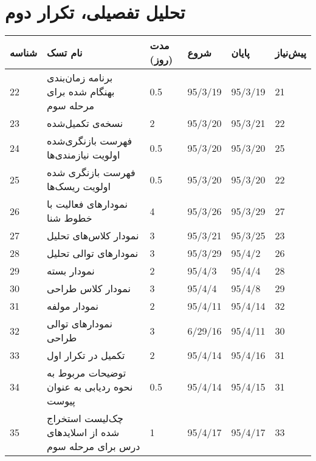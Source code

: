 \section{تحلیل تفصیلی، تکرار دوم}	
\begin{tabular}[H]{ | l | l | l | l | l | l | }
	\hline
	شناسه & نام تسک & مدت (روز) & شروع & پایان & پیش‌نیاز    \\ \hline
	22 & برنامه زمان‌بندی  بهنگام شده برای مرحله سوم & 0.5   &   95/3/19 &   95/3/19 & 21    \\ \hline
	23 & نسخه‌ی تکمیل‌شده \lr{Usecase Realizations} & 2   &   95/3/20 &   95/3/21 & 22    \\ \hline
	24 &  فهرست بازنگری‌شده اولویت نیازمندی‌ها & 0.5   &   95/3/20 &   95/3/20 & 25    \\ \hline
	25 &  فهرست بازنگری شده اولویت ریسک‌ها & 0.5   &   95/3/20 &   95/3/20 & 22    \\ \hline
	26 & نمودارهای فعالیت با خطوط شنا & 4   &   95/3/26 &   95/3/29 & 27    \\ \hline
	27 & نمودار کلاس‌های تحلیل & 3   &   95/3/21 &   95/3/25 & 23    \\ \hline
	28 & نمودارهای توالی تحلیل & 3   &   95/3/29 &   95/4/2 & 26    \\ \hline
	29 & نمودار بسته & 2   &   95/4/3 &   95/4/4 & 28    \\ \hline
	30 & نمودار کلاس طراحی & 3   &   95/4/4 &   95/4/8 & 29    \\ \hline
	31 & نمودار مولفه & 2   &   95/4/11 &   95/4/14 & 32    \\ \hline
	32 & نمودارهای توالی طراحی & 3   &   6/29/16 &   95/4/11 & 30    \\ \hline
	33 & تکمیل \lr{Executable Architectural Baseline} در تکرار اول & 2   &   95/4/14 &   95/4/16 & 31    \\ \hline
	34 & توضیحات مربوط به نحوه ردیابی به عنوان پیوست & 0.5   &   95/4/14 &   95/4/15 & 31    \\ \hline
	35 & چک‌‌لیست استخراج شده از اسلایدهای درس برای مرحله سوم & 1   &   95/4/17 &   95/4/17 & 33 \\ \hline
\end{tabular}


